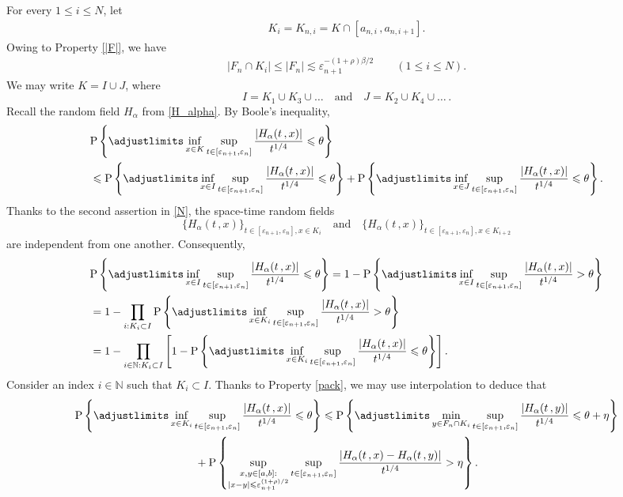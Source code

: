 \documentclass[reqno]{amsart}
\newcommand{\<}{\langle}
\renewcommand{\>}{\rangle}
\newcommand{\N}{\mathbb{N}}
\renewcommand{\P}{\mathrm{P}}
\newcommand{\1}{\mathbb{1}}
\renewcommand{\le}{\leqslant}
\theoremstyle{definition}
\numberwithin{equation}{section}
\begin{document}
For every $1 \le i \le N$, let
\begin{align*}
	K_i = K_{n,i} = K \cap [a_{n,i}\,,a_{n,i+1}].
\end{align*}
Owing to Property \ref{|F|}, we have
\begin{align}\label{FnK}
	|F_n \cap K_i| \le |F_n|
	\lesssim \varepsilon_{n+1}^{-(1+\rho)\beta/2} \qquad (1 \le i \le N).
\end{align}
We may write $K = I \cup J$, where
\[
	I =  K_{1} \cup K_{3} \cup \ldots \quad \text{and} \quad
	J = K_{2} \cup K_{4} \cup \ldots\,.
\]
Recall the random field $H_\alpha$ from \eqref{H_alpha}.
By Boole's inequality,
\begin{align*}
	&\P\left\{ \adjustlimits\inf_{x \in K} 
		\sup_{t \in [\varepsilon_{n+1},\varepsilon_n]}
		\frac{|H_\alpha(t\,,x)|}{t^{1/4}} \le \theta \right\}\\
	&\le \P\left\{ \adjustlimits
		\inf_{x \in I} \sup_{t \in [\varepsilon_{n+1},\varepsilon_n]}
		\frac{|H_\alpha(t\,,x)|}{t^{1/4}} \le \theta \right\} + 
		\P\left\{ \adjustlimits
		\inf_{x \in J} \sup_{t \in [\varepsilon_{n+1},\varepsilon_n]}
		\frac{|H_\alpha(t\,,x)|}{t^{1/4}} \le \theta \right\}.
\end{align*}
Thanks to the second assertion in \eqref{N}, 
the space-time random fields
\[
	\{H_\alpha(t\,,x)\}_{t \in [\varepsilon_{n+1},\varepsilon_n], x \in K_i}
	\quad\text{and}\quad
	\{H_\alpha(t\,,x)\}_{t \in [\varepsilon_{n+1},\varepsilon_n], x \in K_{i+2}}
\]
are independent from one another. Consequently,
\begin{align*}
	&\P\left\{ \adjustlimits
		\inf_{x \in I} \sup_{t \in [\varepsilon_{n+1},\varepsilon_n]} 
		\frac{|H_\alpha(t\,,x)|}{t^{1/4}} \le \theta \right\}
		= 1-\P\left\{ \adjustlimits
		\inf_{x \in I} \sup_{t \in [\varepsilon_{n+1},\varepsilon_n]}
		\frac{|H_\alpha(t\,,x)|}{t^{1/4}} > \theta \right\}\\
	&= 1 - \prod_{i: K_i \subset I} \P\left\{ \adjustlimits\inf_{x \in K_i}
		\sup_{t \in [\varepsilon_{n+1},\varepsilon_n]}
			\frac{|H_\alpha(t\,,x)|}{t^{1/4}} > \theta \right\}\\
	&= 1 - \prod_{i\in\N: K_i \subset I}\left[ 1 - \P\left\{ \adjustlimits
		\inf_{x \in K_i} \sup_{t \in [\varepsilon_{n+1},\varepsilon_n]}
		\frac{|H_\alpha(t\,,x)|}{t^{1/4}} \le \theta \right\} \right].
\end{align*}
Consider an index $i\in\N$ such that $K_i \subset I$. 
Thanks to Property \ref{pack}, we may use interpolation 
to deduce that
\begin{align*}
	&\P\left\{ \adjustlimits\inf_{x \in K_i}
		\sup_{t \in [\varepsilon_{n+1},\varepsilon_n]}
		\frac{|H_\alpha(t\,,x)|}{t^{1/4}} \le \theta \right\}
		\le \P\left\{ \adjustlimits
		\min_{y \in F_n \cap K_i} \sup_{t \in [\varepsilon_{n+1},\varepsilon_n]}
		\frac{|H_\alpha(t\,,y)|}{t^{1/4}} \le \theta + \eta \right\}\\
	&\hskip1.5in + \P\left\{ \sup_{\substack{x,y \in [a,b]:\\ |x-y| \le
		\varepsilon_{n+1}^{(1+\rho)/2}}}
		\sup_{t \in [\varepsilon_{n+1},\varepsilon_n]} 
		\frac{|H_\alpha(t\,,x) - H_\alpha(t\,,y)|}{t^{1/4}} > \eta \right\}.
\end{align*}
\end{document}
